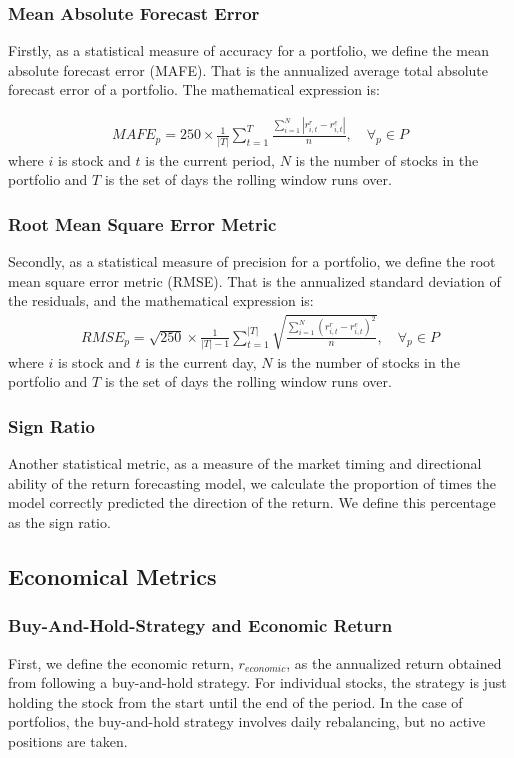 \subsubsection{Mean Absolute Forecast Error}
Firstly, as a statistical measure of accuracy for a portfolio, we define the mean absolute forecast error (MAFE). That is the annualized average total absolute forecast error of a portfolio. The mathematical expression is:

\begin{align}
    MAFE_{p} =  250 \times \frac{1}{|T|}\sum_{t=1}^{T}\frac{\sum_{i=1}^{N}|r_{i,t}^{r} - r_{i,t}^{e}|}{n}, \quad \forall_p \in P
\end{align}
where $i$ is stock and $t$ is the current period, $N$ is the number of stocks in the portfolio and $T$ is the set of days the rolling window runs over.

\subsubsection{Root Mean Square Error Metric}
Secondly, as a statistical measure of precision for a portfolio, we define the root mean square error metric (RMSE). That is the annualized standard deviation of the residuals, and the mathematical expression is:
\begin{align}
    RMSE_{p} = \sqrt{250} \times \frac{1}{|T|-1}\sum_{t=1}^{|T|}\sqrt{\frac{\sum_{i=1}^{N}(r_{i,t}^{r} - r_{i,t}^{e})^{2}}{n}}, \quad \forall_p \in P
\end{align}
where $i$ is stock and $t$ is the current day, $N$ is the number of stocks in the portfolio and $T$ is the set of days the rolling window runs over.

\subsubsection{Sign Ratio}
Another statistical metric, as a measure of the market timing and directional ability of the return forecasting model, we calculate the proportion of times the model correctly predicted the direction of the return. We define this percentage as the sign ratio.

\subsection{Economical Metrics}

\subsubsection{Buy-And-Hold-Strategy and Economic Return}
First, we define the economic return, $r_{economic}$, as the annualized return obtained from following a buy-and-hold strategy. For individual stocks, the strategy is just holding the stock from the start until the end of the period. In the case of portfolios, the buy-and-hold strategy involves daily rebalancing, but no active positions are taken.

